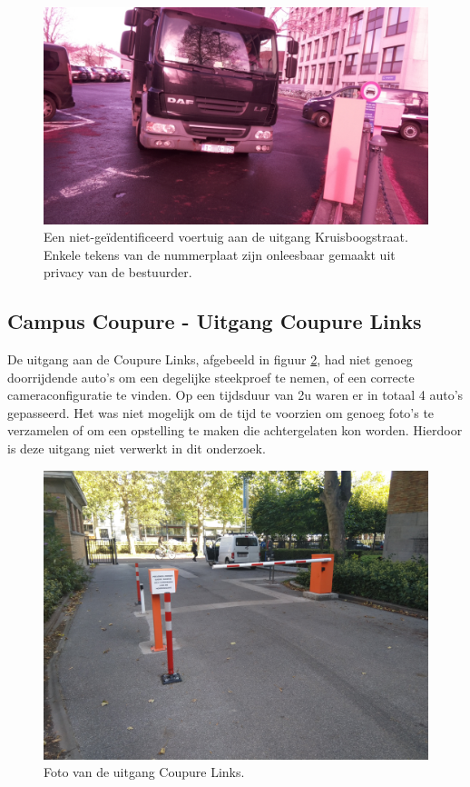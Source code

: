 \begin{figure}[h!]
	\centering
	\includegraphics[width=0.8\linewidth]{img/kruisboog/kruisboog-incorrect.jpg}
	\caption{Een niet-geïdentificeerd voertuig aan de uitgang Kruisboogstraat. Enkele tekens van de nummerplaat zijn onleesbaar gemaakt uit privacy van de bestuurder.}
	\label{fig:kruisboog-incorrect}
\end{figure}

\subsection{Campus Coupure - Uitgang Coupure Links}
De uitgang aan de Coupure Links, afgebeeld in figuur \ref{fig:coupure-links}, had niet genoeg doorrijdende auto's om een degelijke steekproef te nemen, of een correcte cameraconfiguratie te vinden. Op een tijdsduur van 2u waren er in totaal 4 auto's gepasseerd. Het was niet mogelijk om de tijd te voorzien om genoeg foto's te verzamelen of om een opstelling te maken die achtergelaten kon worden. Hierdoor is deze uitgang niet verwerkt in dit onderzoek.

\begin{figure}[h!]
	\centering
	\includegraphics[width=0.8\linewidth]{img/coupure-links/coupure-links.jpg}
	\caption{Foto van de uitgang Coupure Links.}
	\label{fig:coupure-links}
\end{figure}

